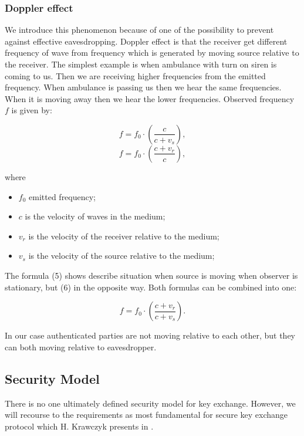 \documentclass[11pt,titlepage]{article}
\theoremstyle{plain}
\begin{document}
\subsubsection{Doppler effect}
We introduce this phenomenon because of one of the possibility to prevent against effective
eavesdropping. Doppler effect is that the receiver get different frequency of wave from frequency which is generated by moving source relative to the receiver. The simplest example
is when ambulance with turn on siren is coming to us. Then we are receiving higher frequencies
from the emitted frequency. When ambulance is passing us then we hear the same
frequencies. When it is moving away then we hear the lower frequencies. Observed frequency $f$ is given by:

\begin{equation}
	f = f_{0} \cdot \left(\frac {c}{c + v_{s}}\right),
\end{equation}
\begin{equation}
	f = f_{0} \cdot \left(\frac {c + v_{r}}{c}\right),
\end{equation}

where

\begin{itemize}
\item $f_0$ emitted frequency;
\item $c$ is the velocity of waves in the medium;
\item $v_r$ is the velocity of the receiver relative to the medium;
\item $v_s$ is the velocity of the source relative to the medium;
\end{itemize}

The formula (5) shows describe situation when source is moving when observer is stationary, but (6) in the opposite way. Both formulas can be combined into one:

\begin{equation}
	f = f_{0} \cdot \left(\frac {c + v_{r}}{c + v_{s}}\right).
\end{equation}

In our case authenticated parties are not moving relative to each other, but they can both moving relative to eavesdropper.

\subsection{Security Model}
There is no one ultimately defined security model for key exchange. However, we will recourse to the requirements as most fundamental for secure key exchange protocol which H. Krawczyk presents in \cite{sign_mac}.
\end{document}
